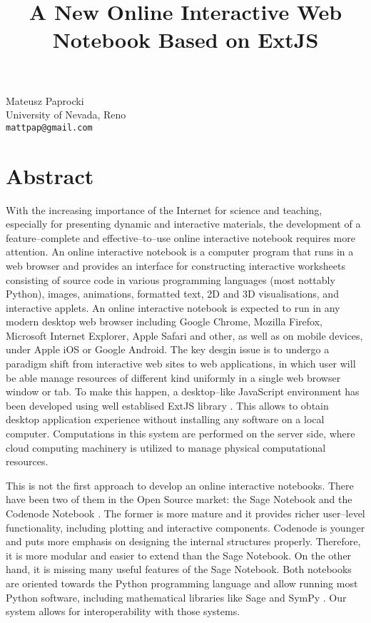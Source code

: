 \title{A New Online Interactive Web Notebook Based on ExtJS}
\author{} \institute{}
\maketitle

\begin{center}
{\large Mateusz Paprocki}\\
University of Nevada, Reno\\
{\tt mattpap@gmail.com}
\end{center}

\section*{Abstract}
With the increasing importance of the Internet for science and teaching, especially for presenting dynamic and interactive materials, the development of a feature--complete and effective--to--use online interactive notebook requires more attention. An online interactive notebook is a computer program that runs in a web browser and provides an interface for constructing interactive worksheets consisting of source code in various programming languages (most nottably Python), images, animations, formatted text, 2D and 3D visualisations, and interactive applets. An online interactive notebook is expected to run in any modern desktop web browser including Google Chrome, Mozilla Firefox, Microsoft Internet Explorer, Apple Safari and other, as well as on mobile devices, under Apple iOS or Google Android. 
The key desgin issue is to undergo a paradigm shift from interactive web sites to web applications, in which user will be able manage resources of different kind uniformly in a single web browser window or tab. To make this happen, a desktop--like JavaScript environment has been developed using well establised ExtJS library \cite{ExtJS}. This allows to obtain desktop application experience without installing any software on a local computer. Computations in this system are performed on the server side, where cloud computing machinery is utilized to manage physical computational resources.

This is not the first approach to develop an online interactive notebooks. There have been two of them in the Open Source market: the Sage Notebook \cite{SageNotebook} and the Codenode Notebook \cite{CodenodeNotebook}. The former is more mature and it provides richer user--level functionality, including plotting and interactive components. Codenode is younger and puts more emphasis on designing the internal structures properly. Therefore, it is more modular and easier to extend than the Sage Notebook. On the other hand, it is missing many useful features of the Sage Notebook. Both notebooks are oriented towards the Python programming language and allow running most Python software, including mathematical libraries like Sage \cite{Sage} and SymPy \cite{SymPy}. Our system allows for interoperability with those systems.

